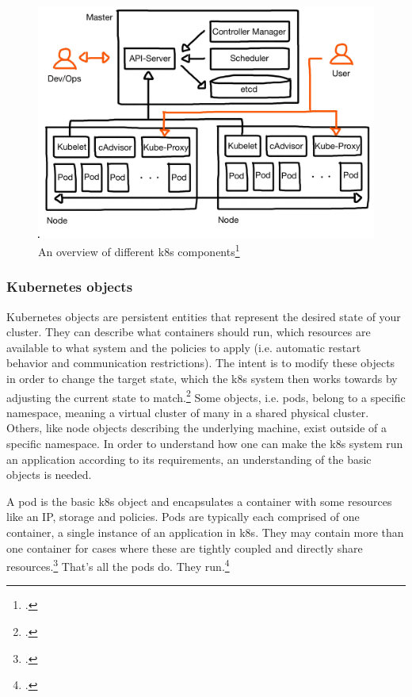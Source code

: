 \begin{figure}[H]
\includegraphics[scale=0.2]{pictures/big-picture.JPG} 
\caption{An overview of different \gls{k8s} components\protect\footcite{nicoPictures}}
\label{fig:k8s-big-picture}
\end{figure}


\subsubsection{Kubernetes objects}
Kubernetes objects are persistent entities that represent the desired state of your cluster. They can describe what containers should run, which resources are available to what system and the policies to apply (i.e. automatic restart behavior and communication restrictions).
The intent is to modify these objects in order to change the target state, which the \gls{k8s} system then works towards by adjusting the current state to match.\footcite[][, section 'Understanding Kubernetes Objects']{k8sObjects}
Some objects, i.e. pods, belong to a specific namespace, meaning a virtual cluster of many in a shared physical cluster. Others, like node objects describing the underlying machine, exist outside of a specific namespace.
In order to understand how one can make the \gls{k8s} system run an application according to its requirements, an understanding of the basic objects is needed.

A pod is the basic \gls{k8s} object and encapsulates a container with some resources like an IP, storage and policies. Pods are typically each comprised of one container, a single instance of an application in \gls{k8s}. They may contain more than one container for cases where these are tightly coupled and directly share resources.\footcite[][, section 'Understanding Pods']{k8sPods}
That's all the pods do. They run.\footcite[][p. 4]{phippy}

